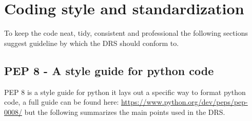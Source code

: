 \chapter{Coding style and standardization}
\label{ch:rules}

To keep the code neat, tidy, consistent and professional the following sections suggest guideline by which the DRS should conform to.

\section{PEP 8 - A style guide for python code}
\label{ch:rules:pep8}

PEP 8 is a style guide for python it lays out a specific way to format python code, a full guide can be found here: \url{https://www.python.org/dev/peps/pep-0008/} but the following summarizes the main points used in the DRS.

